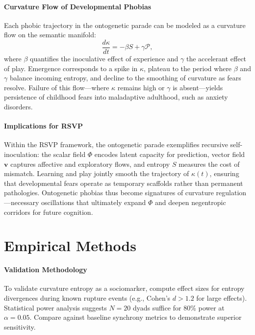 \documentclass{article}
\theoremstyle{definition}
\begin{document}
\subsection{Curvature Flow of Developmental Phobias}

Each phobic trajectory in the ontogenetic parade can be modeled as a curvature
flow on the semantic manifold:
\[
\frac{d\kappa}{dt} = - \beta S + \gamma \mathcal{P},
\]
where $\beta$ quantifies the inoculative effect of experience and $\gamma$ the
accelerant effect of play. Emergence corresponds to a spike in $\kappa$, plateau
to the period where $\beta$ and $\gamma$ balance incoming entropy, and decline to
the smoothing of curvature as fears resolve. Failure of this flow---where
$\kappa$ remains high or $\gamma$ is absent---yields persistence of childhood
fears into maladaptive adulthood, such as anxiety disorders.

\subsection{Implications for RSVP}

Within the RSVP framework, the ontogenetic parade exemplifies recursive
self-inoculation: the scalar field $\Phi$ encodes latent capacity for prediction,
vector field $\mathbf{v}$ captures affective and exploratory flows, and entropy
$S$ measures the cost of mismatch. Learning and play jointly smooth the
trajectory of $\kappa(t)$, ensuring that developmental fears operate as
temporary scaffolds rather than permanent pathologies. Ontogenetic phobias thus
become signatures of curvature regulation---necessary oscillations that
ultimately expand $\Phi$ and deepen negentropic corridors for future cognition.

\part{Empirical Methods}

\subsection{Validation Methodology}

To validate curvature entropy as a sociomarker, compute effect sizes for entropy
divergences during known rupture events (e.g., Cohen's $d > 1.2$ for large
effects). Statistical power analysis suggests $N=20$ dyads suffice for 80\% power
at $\alpha=0.05$. Compare against baseline synchrony metrics to demonstrate
superior sensitivity.
\end{document}
